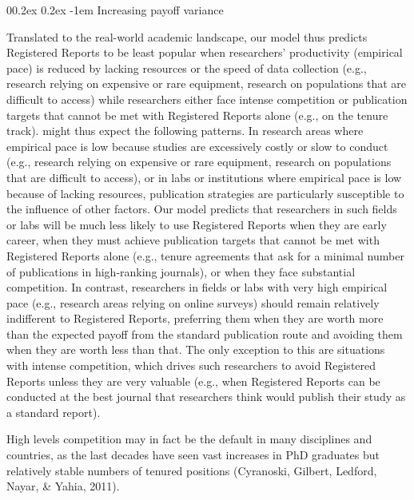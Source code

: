 \documentclass[
  ,man,mask,floatsintext]{apa6}
\makeatletter
\let\oldparagraph\paragraph
\renewcommand{\paragraph}[1]{\oldparagraph{#1}\mbox{}}
\renewcommand{\paragraph}{\@startsection{paragraph}{4}{\parindent}%
  {0\baselineskip \@plus 0.2ex \@minus 0.2ex}%
  {-1em}%
  {\normalfont\normalsize\bfseries\itshape\typesectitle}}
\makeatother
\begin{document}
\hypertarget{increasing-payoff-variance}{%
\paragraph{Increasing payoff variance}\label{increasing-payoff-variance}}

Translated to the real-world academic landscape, our model thus predicts Registered Reports to be least popular
when researchers' productivity (empirical pace) is reduced by lacking resources or the speed of data collection (e.g., research relying on expensive or rare equipment, research on populations that are difficult to access) while researchers either face intense competition or publication targets that cannot be met with Registered Reports alone (e.g., on the tenure track).
might thus expect the following patterns.
In research areas where empirical pace is low because studies are excessively costly or slow to conduct (e.g., research relying on expensive or rare equipment, research on populations that are difficult to access), or in labs or institutions where empirical pace is low because of lacking resources, publication strategies are particularly susceptible to the influence of other factors.
Our model predicts that researchers in such fields or labs will be much less likely to use Registered Reports when they are early career, when they must achieve publication targets that cannot be met with Registered Reports alone (e.g., tenure agreements that ask for a minimal number of publications in high-ranking journals), or when they face substantial competition.
In contrast, researchers in fields or labs with very high empirical pace (e.g., research areas relying on online surveys) should remain relatively indifferent to Registered Reports, preferring them when they are worth more than the expected payoff from the standard publication route and avoiding them when they are worth less than that.
The only exception to this are situations with intense competition, which drives such researchers to avoid Registered Reports unless they are very valuable (e.g., when Registered Reports can be conducted at the best journal that researchers think would publish their study as a standard report).

High levels competition may in fact be the default in many disciplines and countries, as the last decades have seen vast increases in PhD graduates but relatively stable numbers of tenured positions (Cyranoski, Gilbert, Ledford, Nayar, \& Yahia, 2011).
\end{document}
